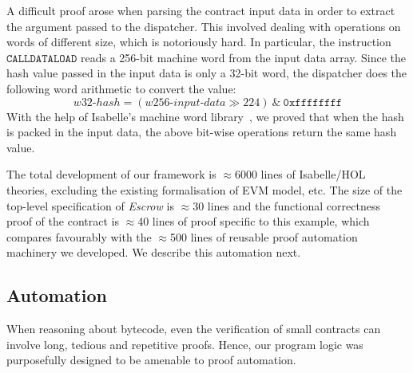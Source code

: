 \documentclass[sigplan,10pt]{acmart}\settopmatter{printfolios=true,printccs=false,printacmref=false}
\newcommand{\instr}[1]{\mathtt{#1}}
\begin{document}
A difficult proof arose when parsing the contract input data
in order to extract the argument passed to the dispatcher.
This involved dealing with operations on words of different size,
which is notoriously hard.
In particular, the instruction $\instr{CALLDATALOAD}$ reads a
256-bit machine word from the input data array.
Since the hash value passed in the input data is only a 32-bit word,
the dispatcher does the following word arithmetic to convert the value:
\[
\mathit{w32}\mbox{-}\mathit{hash} = (\mathit{w256}\mbox{-}\mathit{input}\mbox{-}\mathit{data} \gg 224)\ \text{\&}\ \mathtt{0xffffffff}
\]
With the help of Isabelle's machine word library~\cite{Word_Lib-AFP},
we proved that when the hash is packed in the input data,
the above bit-wise operations return the same hash value.


The total development of our framework is $\approx$6000 lines of Isabelle/HOL theories,
excluding the existing formalisation of EVM model, etc.
The size of the top-level specification of \textit{Escrow} is $\approx$30 lines
and the functional correctness proof of the contract is
$\approx$40 lines of proof specific to this example, which compares
favourably with the $\approx$500 lines of reusable proof
automation machinery we developed.
We describe this automation next.





\subsection{Automation}
\label{sec:auto}
%
When reasoning about bytecode, even the verification of small contracts
can involve long, tedious and repetitive proofs.
Hence, our program logic was purposefully designed to be
amenable to proof automation.
\end{document}
